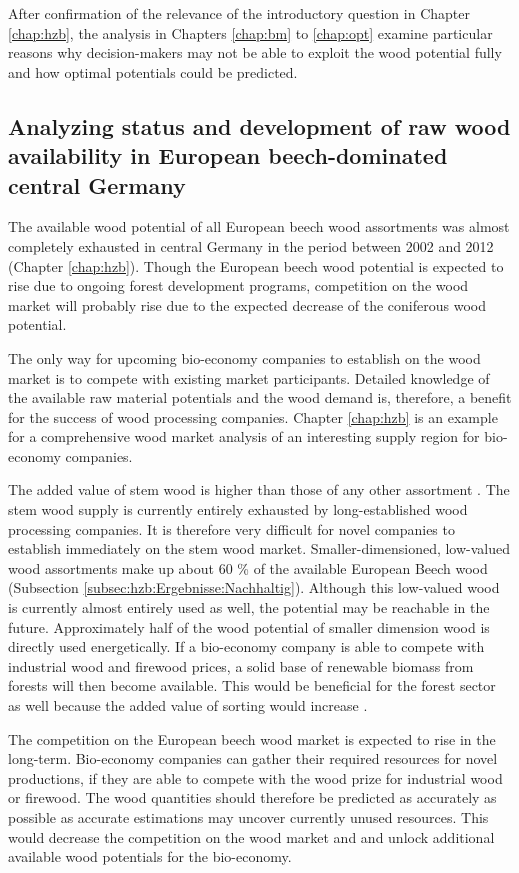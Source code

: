 After confirmation of the relevance of the introductory question in Chapter \ref{chap:hzb}, the analysis in Chapters \ref{chap:bm} to \ref{chap:opt} examine particular reasons why decision-makers may not be able to exploit the wood potential fully and how optimal potentials could be predicted.

\subsection{Analyzing status and development of raw wood availability in European beech-dominated central Germany}
\label{subsec:discussion:struct:hzb}
The available wood potential of all European beech wood assortments was almost completely exhausted in central Germany in the period between 2002 and 2012 (Chapter \ref{chap:hzb}). Though the European beech wood potential is expected to rise due to ongoing forest development programs, competition on the wood market will probably rise due to the expected decrease of the coniferous wood potential.

The only way for upcoming bio-economy companies to establish on the wood market is to compete with existing market participants. Detailed knowledge of the available raw material potentials and the wood demand is, therefore, a benefit for the success of wood processing companies. Chapter \ref{chap:hzb} is an example for a comprehensive wood market analysis of an interesting supply region for bio-economy companies.

The added value of stem wood is higher than those of any other assortment \citep{nagel_2008}. The stem wood supply is currently entirely exhausted by long-established wood processing companies. It is therefore very difficult for novel companies to establish immediately on the stem wood market. Smaller-dimensioned, low-valued wood assortments make up about 60 \% of the available European Beech wood (Subsection \ref{subsec:hzb:Ergebnisse:Nachhaltig}). Although this low-valued wood is currently almost entirely used as well, the potential may be reachable in the future. Approximately half of the wood potential of smaller dimension wood is directly used energetically. If a bio-economy company is able to compete with industrial wood and firewood prices, a solid base of renewable biomass from forests will then become available. This would be beneficial for the forest sector as well because the added value of sorting would increase \cite[p. 67]{mohring_1997}.

The competition on the European beech wood market is expected to rise in the long-term. Bio-economy companies can gather their required resources for novel productions, if they are able to compete with the wood prize for industrial wood or firewood. The wood quantities should therefore be predicted as accurately as possible as accurate estimations may uncover currently unused resources. This would decrease the competition on the wood market and and unlock additional available wood potentials for the bio-economy.

